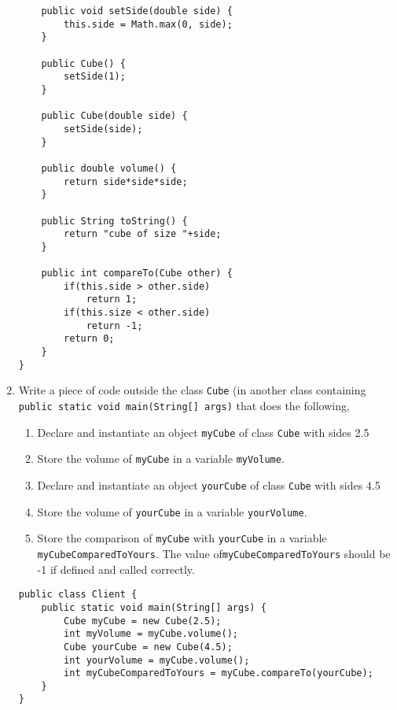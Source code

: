 \begin{questions}
\begin{enumerate}
\begin{solution}
\begin{lstlisting}
	public void setSide(double side) {
		this.side = Math.max(0, side);
	}
	
	public Cube() {
		setSide(1);
	}
	
	public Cube(double side) {
		setSide(side);
	}
	
	public double volume() {
		return side*side*side;
	}
	
	public String toString() {
		return "cube of size "+side;
	}
	
	public int compareTo(Cube other) {
		if(this.side > other.side)
			return 1;
		if(this.size < other.side)
			return -1;
		return 0;
	}
}
\end{lstlisting}
\end{solution}

\ifprintanswers
\else
\newpage
\fi

\item Write a piece of code outside the class \texttt{Cube} (in another class containing \texttt{public static void main(String[] args)} that does the following,

	\begin{enumerate}
		\item Declare and instantiate an object \texttt{myCube} of class \texttt{Cube} with sides 2.5
		\item Store the volume of \texttt{myCube} in a variable \texttt{myVolume}.
		\item Declare and instantiate an object \texttt{yourCube} of class \texttt{Cube} with sides 4.5
		\item Store the volume of \texttt{yourCube} in a variable \texttt{yourVolume}.
		\item Store the comparison of \texttt{myCube} with \texttt{yourCube} in a variable \texttt{myCubeComparedToYours}. The value of\texttt{myCubeComparedToYours} should be -1 if defined and called correctly.
	\end{enumerate}
	
\begin{solution}
\begin{lstlisting}
public class Client {
	public static void main(String[] args) {
		Cube myCube = new Cube(2.5);
		int myVolume = myCube.volume();
		Cube yourCube = new Cube(4.5);
		int yourVolume = myCube.volume();
		int myCubeComparedToYours = myCube.compareTo(yourCube);
	}
}
\end{lstlisting}
\end{solution}

\end{enumerate}


\end{questions}
